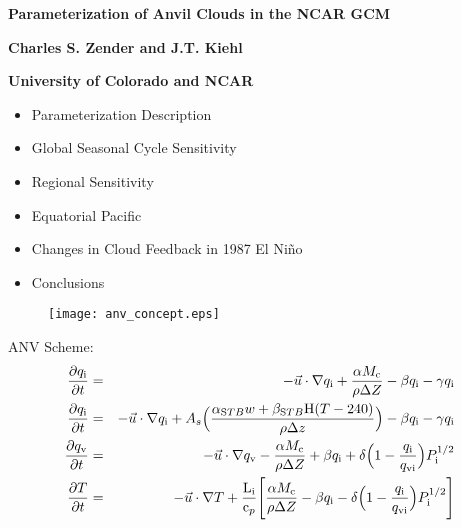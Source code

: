 \documentclass[agupp]{aguplus}
\begin{document}
\begin{center}
\Large
\textbf{Parameterization of Anvil Clouds in the NCAR GCM}

\textbf{Charles S. Zender and J.T. Kiehl}

\textbf{University of Colorado and NCAR}

\end{center}


\medskip

\begin{itemize}
\Large
\item Parameterization Description
\item Global Seasonal Cycle Sensitivity
\item Regional Sensitivity
\item Equatorial Pacific 
\item Changes in Cloud Feedback in 1987 El Ni\~no
\item Conclusions
\end{itemize}

\normalsize
\pagebreak


\begin{figure*}
\texttt{[image: anv\_concept.eps]}
\end{figure*}

\Large
ANV Scheme:
\begin{eqnarray}
{\partial \mbox{$q_\mathrm{i}$}\over \partial t} & 
= & 
-\vec u \cdot \nabla \mbox{$q_\mathrm{i}$} + 
{\alpha M_{\mathrm{c}} \over \rho \Delta Z} - 
\beta \mbox{$q_\mathrm{i}$} - 
\gamma \mbox{$q_\mathrm{i}$} \\
{\partial \mbox{$q_\mathrm{i}$} \over \partial t} & 
= & 
-\vec u \cdot \nabla \mbox{$q_\mathrm{i}$} + 
A_s\Bigl(
{\alpha_{\mathrm STB} w + \beta_{\mathrm STB} {\mathrm H}(T - 240)
\over \rho \Delta z} \Bigr) -
\beta \mbox{$q_\mathrm{i}$} - 
\gamma \mbox{$q_\mathrm{i}$} \\
{\partial \mbox{$q_\mathrm{v}$} \over \partial t} &
= & 
-\vec u \cdot \nabla \mbox{$q_\mathrm{v}$} - 
{\alpha \mbox{$M_\mathrm{c}$} \over \rho \Delta Z} + 
\beta \mbox{$q_\mathrm{i}$} + 
\delta \Bigl(1 - {\mbox{$q_\mathrm{i}$} \over
\mbox{$q_\mathrm{vi}$}}\Bigr)P_{\mathrm{i}}^{1/2} \\
{\partial T \over \partial t} &
= &
 -\vec u \cdot \nabla T +
{\mbox{L}_{\mathrm{i}} \over {\mathrm c_p}}\Biggl[
{\alpha \mbox{$M_\mathrm{c}$} \over \rho \Delta Z} - 
\beta \mbox{$q_\mathrm{i}$} - 
\delta \Bigl(1 - {\mbox{$q_\mathrm{i}$} \over \mbox{$q_\mathrm{vi}$}}\Bigr)P_{\mathrm{i}}^{1/2}
\Biggr]
\end{eqnarray}
\end{document}
